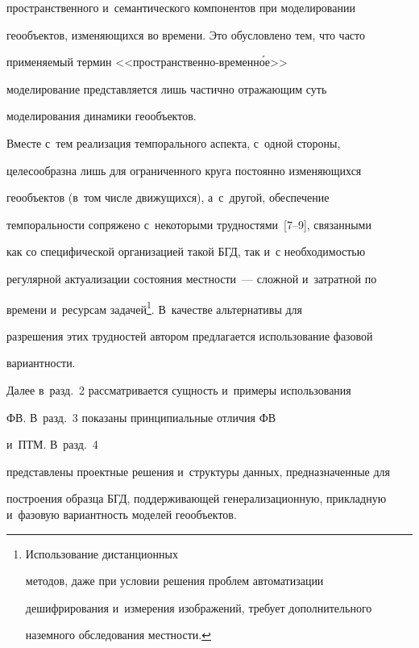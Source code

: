 пространственного и~семантического компонентов при моделировании 


геообъектов, из\-ме\-ня\-ющих\-ся во времени. Это обусловлено тем, что часто 


применяемый термин <<про\-стран\-ст\-вен\-но-вре\-мен\-н\'{о}е>> 


моделирование представляется лишь час\-тич\-но от\-ра\-жа\-ющим суть 


моделирования динамики геообъектов.


  


  Вместе с~тем реализация темпорального аспекта, с~одной стороны, 


целесообразна лишь для ограниченного круга постоянно из\-ме\-ня\-ющих\-ся 


геообъектов (в~том чис\-ле движущихся), а~с~другой, обеспечение 


темпоральности сопряжено с~некоторыми трудностями~[7--9], связанными 


как со специфической организацией такой БГД, так и~с необходимостью 


регулярной актуализации со\-сто\-яния мест\-ности~--- слож\-ной и~за\-трат\-ной по 


времени и~ресурсам задачей\footnote{Использование дистанционных 


методов, даже при условии решения проблем автоматизации 


дешифрирования и~измерения изображений, требует дополнительного 


наземного обследования местности.}. В~качестве альтернативы для 


разрешения этих трудностей автором предлагается использование фазовой 


ва\-ри\-ант\-ности.


  


  Далее в~разд.~2 рассматривается сущность и~примеры использования 


ФВ. В~разд.~3 показаны принципиальные отличия ФВ 


и~ПТМ. В~разд.~4 


представлены проектные решения и~структуры данных, пред\-на\-зна\-чен\-ные для 


построения образца БГД, под\-дер\-жи\-ва\-ющей генерализационную, при\-клад\-ную и~фазовую ва\-ри\-ант\-ность моделей геообъектов.





